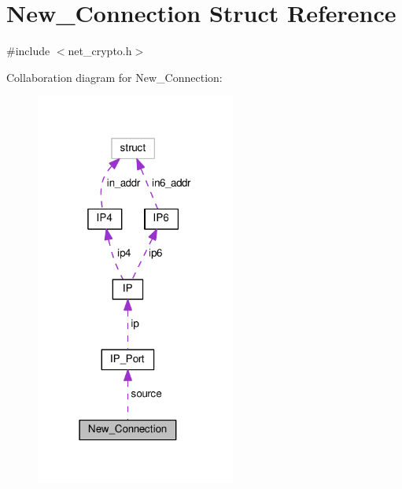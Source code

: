 \hypertarget{struct_new___connection}{\section{New\+\_\+\+Connection Struct Reference}
\label{struct_new___connection}
}


{\ttfamily \#include $<$net\+\_\+crypto.\+h$>$}



Collaboration diagram for New\+\_\+\+Connection\+:
\nopagebreak
\begin{figure}[H]
\begin{center}
\leavevmode
\includegraphics[width=186pt]{dd/d92/struct_new___connection__coll__graph}
\end{center}
\end{figure}
